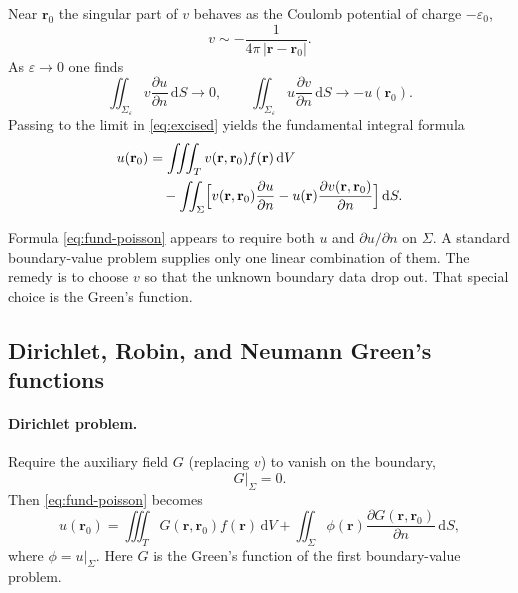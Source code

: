 Near $\mathbf{r}_0$ the singular part of $v$ behaves as the Coulomb potential of charge $-\varepsilon_0$,
\begin{equation}
v\sim-\frac{1}{4\pi\,|\mathbf{r}-\mathbf{r}_0|}.
\end{equation}
As $\varepsilon\to0$ one finds
\begin{equation}
\iint_{\Sigma_\varepsilon}v\frac{\partial u}{\partial n}\,\mathrm{d}S\to0,
\qquad
\iint_{\Sigma_\varepsilon}u\frac{\partial v}{\partial n}\,\mathrm{d}S\to-u(\mathbf{r}_0).
\end{equation}
Passing to the limit in \eqref{eq:excised} yields the fundamental integral formula
\begin{equation}
\label{eq:fund-poisson}
\begin{aligned}
u(\mathbf{r}_0)
&=\iiint_{T}v(\mathbf{r},\mathbf{r}_0)f(\mathbf{r})\,\mathrm{d}V\\
&\quad-\iint_{\Sigma}\Bigl[
v(\mathbf{r},\mathbf{r}_0)\frac{\partial u}{\partial n}
-u(\mathbf{r})\frac{\partial v(\mathbf{r},\mathbf{r}_0)}{\partial n}
\Bigr]\,\mathrm{d}S.
\end{aligned}
\end{equation}

\begin{note}
Formula \eqref{eq:fund-poisson} appears to require both $u$ and $\partial u/\partial n$ on $\Sigma$. A standard boundary-value problem supplies only one linear combination of them. The remedy is to choose $v$ so that the unknown boundary data drop out. That special choice is the Green's function.
\end{note}

\subsection{Dirichlet, Robin, and Neumann Green's functions}

\paragraph{Dirichlet problem.}
Require the auxiliary field $G$ (replacing $v$) to vanish on the boundary,
\begin{equation}
G\big|_{\Sigma}=0.
\end{equation}
Then \eqref{eq:fund-poisson} becomes
\begin{equation}
\label{eq:dirichlet-G}
u(\mathbf{r}_0)
=\iiint_{T}G(\mathbf{r},\mathbf{r}_0)f(\mathbf{r})\,\mathrm{d}V
+\iint_{\Sigma}\phi(\mathbf{r})\frac{\partial G(\mathbf{r},\mathbf{r}_0)}{\partial n}\,\mathrm{d}S,
\end{equation}
where $\phi=u|_{\Sigma}$. Here $G$ is the Green's function of the first boundary-value problem.

